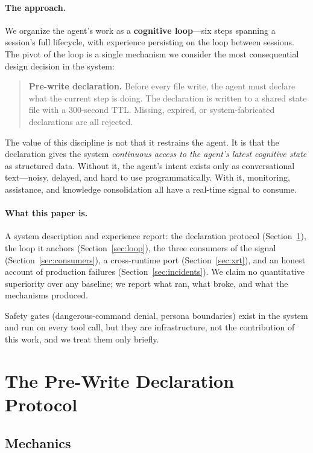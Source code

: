 \documentclass{article}
\begin{document}
\paragraph{The approach.}
We organize the agent's work as a \textbf{cognitive loop}---six steps spanning a session's full lifecycle, with experience persisting on the loop between sessions. The pivot of the loop is a single mechanism we consider the most consequential design decision in the system:

\begin{quote}
\textbf{Pre-write declaration.} Before every file write, the agent must declare what the current step is doing. The declaration is written to a shared state file with a 300-second TTL. Missing, expired, or system-fabricated declarations are all rejected.
\end{quote}

The value of this discipline is not that it restrains the agent. It is that the declaration gives the system \emph{continuous access to the agent's latest cognitive state} as structured data. Without it, the agent's intent exists only as conversational text---noisy, delayed, and hard to use programmatically. With it, monitoring, assistance, and knowledge consolidation all have a real-time signal to consume.

\paragraph{What this paper is.}
A system description and experience report: the declaration protocol (Section~\ref{sec:decl}), the loop it anchors (Section~\ref{sec:loop}), the three consumers of the signal (Section~\ref{sec:consumers}), a cross-runtime port (Section~\ref{sec:xrt}), and an honest account of production failures (Section~\ref{sec:incidents}). We claim no quantitative superiority over any baseline; we report what ran, what broke, and what the mechanisms produced.

Safety gates (dangerous-command denial, persona boundaries) exist in the system and run on every tool call, but they are infrastructure, not the contribution of this work, and we treat them only briefly.

\section{The Pre-Write Declaration Protocol}\label{sec:decl}

\subsection{Mechanics}
\end{document}
